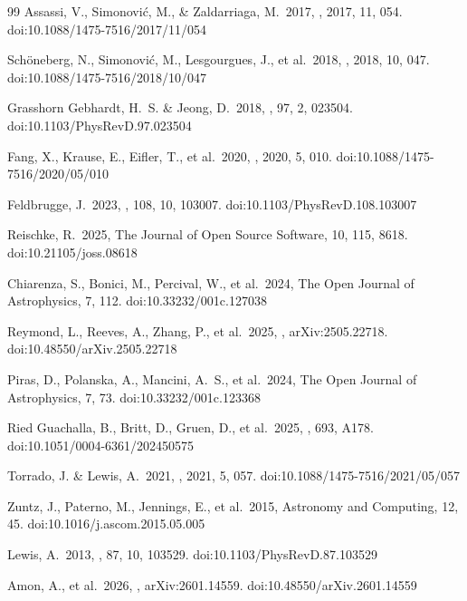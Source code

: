 \documentclass[a4paper, 11pt]{article}
\begin{document}
\begin{thebibliography}{99}
 Assassi, V., Simonovi{\'c}, M., \& Zaldarriaga, M.\ 2017, \jcap, 2017, 11, 054. doi:10.1088/1475-7516/2017/11/054

 Sch{\"o}neberg, N., Simonovi{\'c}, M., Lesgourgues, J., et al.\ 2018, \jcap, 2018, 10, 047. doi:10.1088/1475-7516/2018/10/047

 Grasshorn Gebhardt, H.~S. \& Jeong, D.\ 2018, \prd, 97, 2, 023504. doi:10.1103/PhysRevD.97.023504

 Fang, X., Krause, E., Eifler, T., et al.\ 2020, \jcap, 2020, 5, 010. doi:10.1088/1475-7516/2020/05/010

 Feldbrugge, J.\ 2023, \prd, 108, 10, 103007. doi:10.1103/PhysRevD.108.103007

 Reischke, R.\ 2025, The Journal of Open Source Software, 10, 115, 8618. doi:10.21105/joss.08618

 Chiarenza, S., Bonici, M., Percival, W., et al.\ 2024, The Open Journal of Astrophysics, 7, 112. doi:10.33232/001c.127038

 Reymond, L., Reeves, A., Zhang, P., et al.\ 2025, , arXiv:2505.22718. doi:10.48550/arXiv.2505.22718

 Piras, D., Polanska, A., Mancini, A.~S., et al.\ 2024, The Open Journal of Astrophysics, 7, 73. doi:10.33232/001c.123368

 Ried Guachalla, B., Britt, D., Gruen, D., et al.\ 2025, \aap, 693, A178. doi:10.1051/0004-6361/202450575

 Torrado, J. \& Lewis, A.\ 2021, \jcap, 2021, 5, 057. doi:10.1088/1475-7516/2021/05/057

 Zuntz, J., Paterno, M., Jennings, E., et al.\ 2015, Astronomy and Computing, 12, 45. doi:10.1016/j.ascom.2015.05.005

 Lewis, A.\ 2013, \prd, 87, 10, 103529. doi:10.1103/PhysRevD.87.103529

 Amon, A., et al.\ 2026, , arXiv:2601.14559. doi:10.48550/arXiv.2601.14559


\end{thebibliography}
\end{document}

